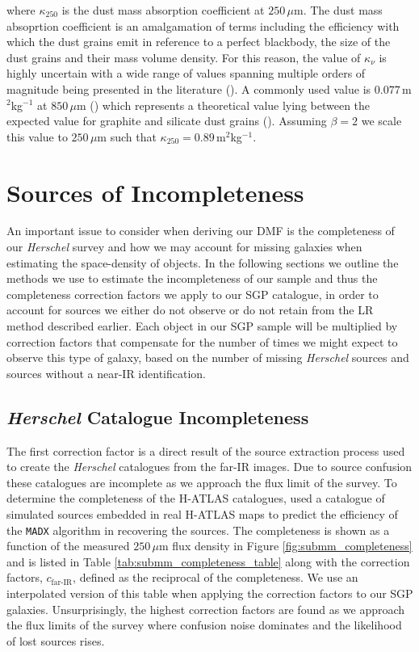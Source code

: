 \noindent where $\kappa_{250}$ is the dust mass absorption coefficient at $250\,\mu$m. The dust mass absoprtion coefficient is an amalgamation of terms including the efficiency with which the dust grains emit in reference to a perfect blackbody, the size of the dust grains and their mass volume density. For this reason, the value of $\kappa_\nu$ is highly uncertain with a wide range of values spanning multiple orders of magnitude being presented in the literature (\citealt{Clark_2019}). A commonly used value is $0.077\,$m$^2$kg$^{-1}$ at $850\,\mu$m (\citealt{Dunne_2000, daCunha_2008, Dunne_2011}) which represents a theoretical value lying between the expected value for graphite and silicate dust grains (\citealt{Draine_1984}). Assuming $\beta = 2$ we scale this value to $250\,\mu$m such that $\kappa_{250} = 0.89\,$m$^2$kg$^{-1}$.

\section{Sources of Incompleteness}

An important issue to consider when deriving our DMF is the completeness of our \textit{Herschel} survey and how we may account for missing galaxies when estimating the space-density of objects. In the following sections we outline the methods we use to estimate the incompleteness of our sample and thus the completeness correction factors we apply to our SGP catalogue, in order to account for sources we either do not observe or do not retain from the LR method described earlier. Each object in our SGP sample will be multiplied by correction factors that compensate for the number of times we might expect to observe this type of galaxy, based on the number of missing \textit{Herschel} sources and sources without a near-IR identification.

\subsection{\textit{Herschel} Catalogue Incompleteness}

The first correction factor is a direct result of the source extraction process used to create the \textit{Herschel} catalogues from the far-IR images. Due to source confusion these catalogues are incomplete as we approach the flux limit of the survey. To determine the completeness of the H-ATLAS catalogues, \citealt{Valiante_2016} used a catalogue of simulated sources embedded in real H-ATLAS maps to predict the efficiency of the \texttt{MADX} algorithm in recovering the sources. The completeness is shown as a function of the measured $250\,\mu$m flux density in Figure \ref{fig:submm_completeness} and is listed in Table \ref{tab:submm_completeness_table} along with the correction factors, $c_{\textrm{far-IR}}$, defined as the reciprocal of the completeness. We use an interpolated version of this table when applying the correction factors to our SGP galaxies. Unsurprisingly, the highest correction factors are found as we approach the flux limits of the survey where confusion noise dominates and the likelihood of lost sources rises.

